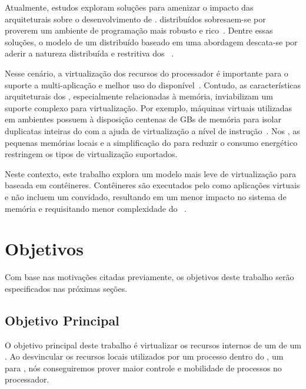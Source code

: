 Atualmente, estudos exploram soluções para amenizar o impacto das arquiteturais sobre o desenvolvimento de \software. \oss distribuídos sobresaem-se por proverem um ambiente de programação mais robusto e rico~\cite{asmussen_m3:_2016, kluge_operating_2014, penna:sbesc19}. Dentre essas soluções, o modelo de um \os distribuído baseado em uma abordagem \multikernel descata-se por aderir a natureza distribuída e restritiva dos \lws~\cite{penna2017-1,penna2017-2,penna2019}.

Nesse cenário, a virtualização dos recursos do processador é importante para o suporte a multi-aplicação e melhor uso do \hardware disponível~\cite{vanz2022virtualizaccao}. Contudo, as características arquiteturais dos \lws, especialmente relacionadas à memória, inviabilizam um suporte complexo para virtualização. Por exemplo, máquinas virtuais utilizadas em ambientes \cloud possuem à disposição centenas de GBs de memória para isolar duplicatas inteiras do \os com a ajuda de virtualização a nível de instrução~\cite{sharma2016containers}. Nos \lws, as pequenas memórias locais e a simplificação do \hardware para reduzir o consumo energético restringem os tipos de virtualização suportados.

Neste contexto, este trabalho explora um modelo mais leve de virtualização para \lws baseada em contêineres. Contêineres são executados pelo \os como aplicações virtuais e não incluem um \os convidado, resultando em um menor impacto no sistema de memória e requisitando menor complexidade do \hardware~\cite{thalheim2018cntr, sharma2016containers}.

\section{Objetivos}
\label{sec.goals}

Com base nas motivações citadas previamente, os objetivos deste trabalho serão especificados nas próximas seções.

\subsection{Objetivo Principal}
\label{sec.goals.primary}

O objetivo principal deste trabalho é virtualizar os recursos internos de um \cluster de um \lw. Ao desvincular os recursos locais utilizados por um processo dentro do \nanvix, um \os para \lws, nós conseguiremos prover maior controle e mobilidade de processos no processador.

